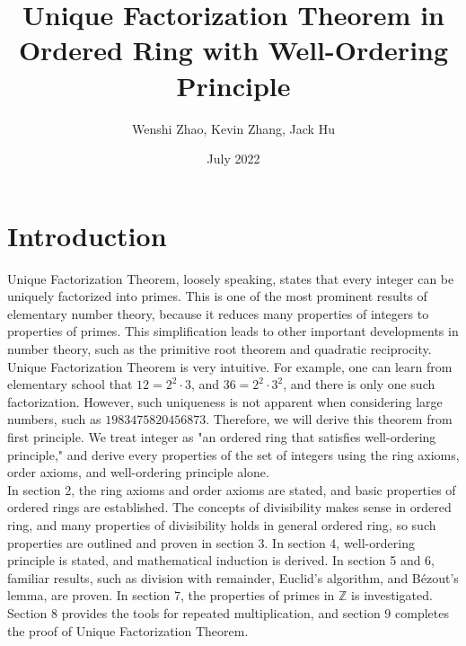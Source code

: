 \documentclass{article}
\title{Unique Factorization Theorem in Ordered Ring with Well-Ordering Principle}
\author{Wenshi Zhao, Kevin Zhang, Jack Hu}
\date{July 2022}
\newcommand{\Z}{\mathbb{Z}}
\begin{document}
\maketitle

\section{Introduction}

Unique Factorization Theorem, loosely speaking, states that every integer can be uniquely factorized into primes. This is one of the most prominent results of elementary number theory, because it reduces many properties of integers to properties of primes. This simplification leads to other important developments in number theory, such as the primitive root theorem and quadratic reciprocity. \\

Unique Factorization Theorem is very intuitive. For example, one can learn from elementary school that $12 = 2^2 \cdot 3$, and $36 = 2^2 \cdot 3^2$, and there is only one such factorization. However, such uniqueness is not apparent when considering large numbers, such as $1983475820456873$. Therefore, we will derive this theorem from first principle. We treat integer as "an ordered ring that satisfies well-ordering principle," and derive every properties of the set of integers using the ring axioms, order axioms, and well-ordering principle alone. \\

In section 2, the ring axioms and order axioms are stated, and basic properties of ordered rings are established. The concepts of divisibility makes sense in ordered ring, and many properties of divisibility holds in general ordered ring, so such properties are outlined and proven in section 3. In section 4, well-ordering principle is stated, and mathematical induction is derived. In section 5 and 6, familiar results, such as division with remainder, Euclid's algorithm, and Bézout's lemma, are proven. In section 7, the properties of primes in $\Z$ is investigated. Section 8 provides the tools for repeated multiplication, and section 9 completes the proof of Unique Factorization Theorem.
\end{document}

